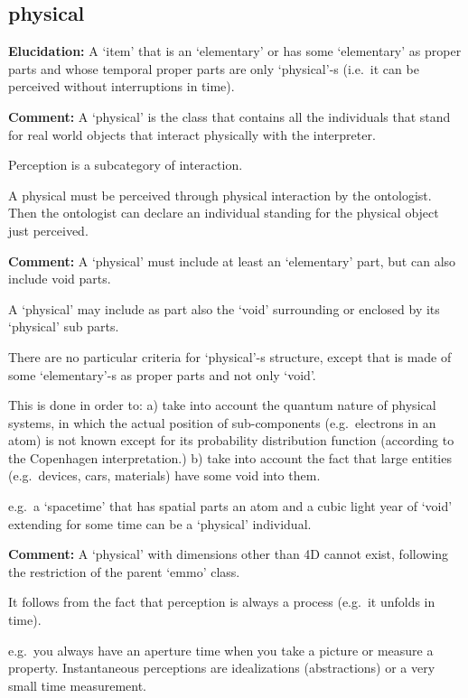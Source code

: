 \documentclass[a4paper,]{report}
\begin{document}
\hypertarget{physical}{%
\subsection{physical}\label{physical}}

\textbf{Elucidation:} A `item' that is an `elementary' or has some
`elementary' as proper parts and whose temporal proper parts are only
`physical'-s (i.e.~it can be perceived without interruptions in time).

\textbf{Comment:} A `physical' is the class that contains all the
individuals that stand for real world objects that interact physically
with the interpreter.

Perception is a subcategory of interaction.

A physical must be perceived through physical interaction by the
ontologist. Then the ontologist can declare an individual standing for
the physical object just perceived.

\textbf{Comment:} A `physical' must include at least an `elementary'
part, but can also include void parts.

A `physical' may include as part also the `void' surrounding or enclosed
by its `physical' sub parts.

There are no particular criteria for `physical'-s structure, except that
is made of some `elementary'-s as proper parts and not only `void'.

This is done in order to: a) take into account the quantum nature of
physical systems, in which the actual position of sub-components
(e.g.~electrons in an atom) is not known except for its probability
distribution function (according to the Copenhagen interpretation.) b)
take into account the fact that large entities (e.g.~devices, cars,
materials) have some void into them.

e.g.~a `spacetime' that has spatial parts an atom and a cubic light year
of `void' extending for some time can be a `physical' individual.

\textbf{Comment:} A `physical' with dimensions other than 4D cannot
exist, following the restriction of the parent `emmo' class.

It follows from the fact that perception is always a process (e.g.~it
unfolds in time).

e.g.~you always have an aperture time when you take a picture or measure
a property. Instantaneous perceptions are idealizations (abstractions)
or a very small time measurement.
\end{document}
